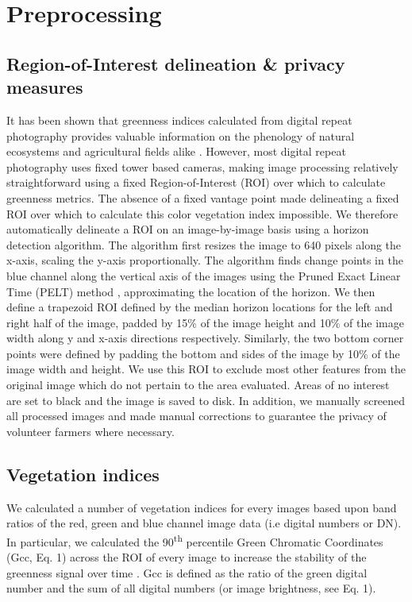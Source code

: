 \documentclass[, manuscript]{copernicus}
\begin{document}
\section{Preprocessing}

\subsection{Region-of-Interest delineation \& privacy measures}

It has been shown that greenness indices calculated from digital repeat
photography provides valuable information on the phenology of natural
ecosystems and agricultural fields alike
\citep{richardson2018, hufkens2016, hufkens2019}. However, most digital
repeat photography uses fixed tower based cameras, making image
processing relatively straightforward using a fixed Region-of-Interest
(ROI) over which to calculate greenness metrics. The absence of a fixed
vantage point made delineating a fixed ROI over which to calculate this
color vegetation index impossible. We therefore automatically delineate
a ROI on an image-by-image basis using a horizon detection algorithm.
The algorithm first resizes the image to 640 pixels along the x-axis,
scaling the y-axis proportionally. The algorithm finds change points in
the blue channel along the vertical axis of the images using the Pruned
Exact Linear Time (PELT) method \citep{killick2011}, approximating the
location of the horizon. We then define a trapezoid ROI defined by the
median horizon locations for the left and right half of the image,
padded by 15\% of the image height and 10\% of the image width along y
and x-axis directions respectively. Similarly, the two bottom corner
points were defined by padding the bottom and sides of the image by 10\%
of the image width and height. We use this ROI to exclude most other
features from the original image which do not pertain to the area
evaluated. Areas of no interest are set to black and the image is saved
to disk. In addition, we manually screened all processed images and made
manual corrections to guarantee the privacy of volunteer farmers where
necessary.

\subsection{Vegetation indices}

We calculated a number of vegetation indices for every images based upon
band ratios of the red, green and blue channel image data (i.e digital
numbers or DN). In particular, we calculated the 90\textsuperscript{th}
percentile Green Chromatic Coordinates (Gcc, Eq. 1) across the ROI of
every image to increase the stability of the greenness signal over time
\citep{Sonnentag2012, richardson2018}. Gcc is defined as the ratio of
the green digital number and the sum of all digital numbers (or image
brightness, see Eq. 1).
\end{document}
